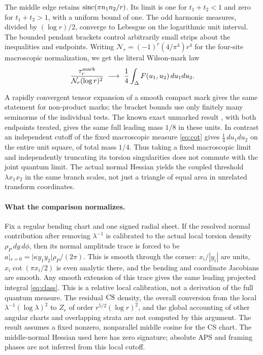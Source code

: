 The middle edge retains \(\operatorname{sinc}(\pi n_1n_2/r)\). Its limit is one for \(t_1+t_2<1\) and zero for \(t_1+t_2>1\), with a uniform bound of one. The odd harmonic measures, divided by \((\log r)/2\), converge to Lebesgue on the logarithmic unit interval. The bounded pendant brackets control arbitrarily small strips about the inequalities and endpoints. Writing \(\mathcal N_r=(-1)^r(4/\pi^4)r^4\) for the four-site macroscopic normalization, we get the literal Wilson-mark law
\begin{equation}\label{eq:qmark}
 \frac{\tau_r^{\rm mark}}{\mathcal N_r(\log r)^2}
  \ \longrightarrow\ \frac14\int_\Delta F(u_1,u_2)\,du_1du_2 .
\end{equation}
\begin{samepage}A rapidly convergent tensor expansion of a smooth compact mark gives the same statement for non-product marks; the bracket bounds use only finitely many seminorms of the individual tests. The known exact unmarked result \cite{P48}, with both endpoints treated, gives the same full leading mass \(1/8\) in these units. In contrast an independent cutoff of the fixed macroscopic measure \eqref{eq:cot} gives \(\tfrac14\,du_1du_2\) on the entire unit square, of total mass \(1/4\). Thus taking a fixed macroscopic limit and independently truncating its torsion singularities does not commute with the joint quantum limit. The actual normal Hessian yields the coupled threshold \(\lambda x_1x_2\) in the same branch scales, not just a triangle of equal area in unrelated transform coordinates.

\paragraph{What the comparison normalizes.}
Fix a regular bending chart and one signed radial sheet. If the resolved normal contribution after removing \(\lambda^{-1}\) is calibrated to the actual local torsion density \(\rho_P\,dy\,d\phi\), then its normal amplitude trace is forced to be \(a|_{s=0}=|\kappa y_1y_2|\rho_P/(2\pi)\). This is smooth through the corner: \(x_i/|y_i|\) are units, \(x_i\cot(\pi x_i/2)\) is even analytic there, and the bending and coordinate Jacobians are smooth. Any smooth extension of this trace gives the same leading projected integral \eqref{eq:class}. This is a relative local calibration, not a derivation of the full quantum measure. The residual \(\operatorname{CS}\) density, the overall conversion from the local \(\lambda^{-1}(\log\lambda)^2\) to \(Z_r\) of order \(r^{5/2}(\log r)^2\), and the global accounting of other angular charts and overlapping strata are not computed by this argument. The result assumes a fixed nonzero, nonparallel middle cosine for the CS chart. The middle-normal Hessian used here has zero signature; absolute APS and framing phases are not inferred from this local cutoff.

\par\end{samepage}
